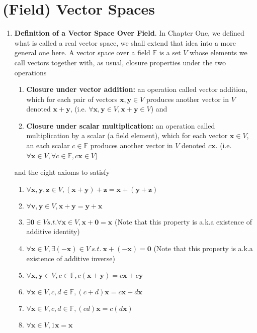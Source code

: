 \documentclass[oneside, 12pt]{book}
\newcommand{\settag}[1]{\renewcommand{\theenumi}{#1}}
\newcommand{\field}{\mathbb{F}}
\newcommand{\tbf}[1]{\textbf{#1}}
\newcommand{\para}[1]{\item \tbf{#1}}
\newcommand{\vzero}{\mathbf{0}}
\begin{document}
\section{(Field) Vector Spaces}
\begin{enumerate}
    \settag{5.2.1}
    \para{Definition of a Vector Space Over Field}. In Chapter One, we defined what is called a 
    real vector space, we shall extend that idea into a more general one here.
    A vector space over a field $\field$ is a set $V$ whose elements we call vectors together with, 
    as usual, closure properties under the two operations 
    \begin{enumerate}
        \item \textbf{Closure under vector addition:} an operation called vector addition, which for each pair of vectors $\mathbf{x}, \mathbf{y}\in V$ produces another vector in $V$ denoted $\mathbf{x} + \mathbf{y}$, (i.e. $\forall \mathbf{x}, \mathbf{y}\in V, \mathbf{x} + \mathbf{y} \in V$) and
        \item \textbf{Closure under scalar multiplication:} an operation called multiplication by a scalar (a field element), which for each vector $\mathbf{x}\in V$, an each scalar $c\in \mathbb{F}$ produces another vector in $V$ denoted $c\mathbf{x}$. (i.e. $\forall \mathbf{x}\in V, \forall c \in \mathbb{F}, c \mathbf{x} \in V$)
    \end{enumerate}
    and the eight axioms to satisfy
    \begin{enumerate}
        \item $\forall \mathbf{x}, \mathbf{y}, \mathbf{z} \in V, (\mathbf{x} + \mathbf{y}) + \mathbf{z} = \mathbf{x} + (\mathbf{y} + \mathbf{z})$
        \item $\forall \mathbf{v}, \mathbf{y} \in V, \mathbf{x} + \mathbf{y} = \mathbf{y} + \mathbf{x}$
        \item $\exists \vzero \in V s.t. \forall \mathbf{x} \in V, \mathbf{x} + \vzero = \mathbf{x}$ (Note that this property is a.k.a existence of additive identity)
        \item $\forall \mathbf{x} \in V, \exists (-\mathbf{x}) \in V~s.t.~\mathbf{x} + (-\mathbf{x}) = \vzero$ (Note that this property is a.k.a existence of additive inverse)
        \item $\forall \mathbf{x}, \mathbf{y} \in V, c \in \mathbb{F}, c(\mathbf{x} + \mathbf{y}) = c\mathbf{x} + c\mathbf{y}$
        \item $\forall \mathbf{x} \in V, c,d \in \mathbb{F}, (c + d)\mathbf{x} = c\mathbf{x} + d\mathbf{x}$
        \item $\forall \mathbf{x} \in V, c,d \in \mathbb{F}, (cd)\mathbf{x} = c(d\mathbf{x})$
        \item $\forall \mathbf{x} \in V, 1\mathbf{x} = \mathbf{x}$
    \end{enumerate}
\end{enumerate}
\end{document}
